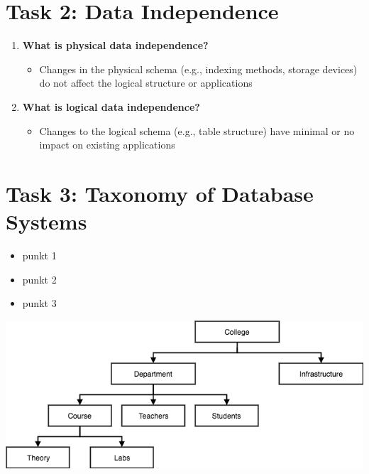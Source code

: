 \documentclass{article}
\begin{document}
\section*{Task 2: Data Independence}
\begin{enumerate}
\item \textbf{What is physical data independence?}
\begin{itemize}
	\item Changes in the physical schema (e.g., indexing methods, storage devices) do not affect the logical structure or applications
\end{itemize}

\item \textbf{What is logical data independence?}
\begin{itemize}
	\item Changes to the logical schema (e.g., table structure) have minimal or no impact on existing applications
\end{itemize}
\end{enumerate}




\section*{Task 3: Taxonomy of Database Systems}


\begin{minipage}[t][10cm]{0.5\textwidth}
\begin{itemize}
	\item punkt 1
	\item punkt 2
	\item punkt 3
\end{itemize}
\end{minipage}
\hfill
\begin{minipage}[t][10cm]{0.5\textwidth}
\includegraphics[width=1\textwidth]{hierarchical-dbms-model.jpg}
\end{minipage}
\end{document}
